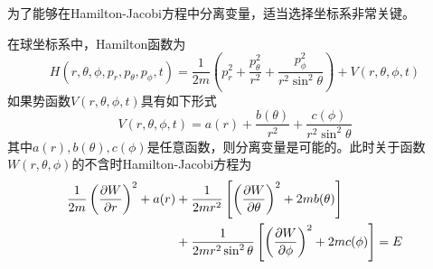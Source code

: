 为了能够在Hamilton-Jacobi方程中分离变量，适当选择坐标系非常关键。

\begin{example}
在球坐标系中，Hamilton函数为
\begin{equation}
	H(r,\theta,\phi,p_r,p_\theta,p_\phi,t) = \frac{1}{2m}\left(p_r^2+\frac{p_\theta^2}{r^2}+\frac{p_\phi^2}{r^2\sin^2\theta}\right)+V(r,\theta,\phi,t)
	\label{球坐标系中Hamilton-Jacobi方程的分离变量-1.1}
\end{equation}
如果势函数$V(r,\theta,\phi,t)$具有如下形式
\begin{equation}
	V(r,\theta,\phi,t) = a(r)+\frac{b(\theta)}{r^2}+\frac{c(\phi)}{r^2\sin^2\theta}
	\label{球坐标系中Hamilton-Jacobi方程的分离变量-1.2}
\end{equation}
其中$a(r),b(\theta),c(\phi)$是任意函数，则分离变量是可能的。此时关于函数$W(r,\theta,\phi)$的不含时Hamilton-Jacobi方程为
\begin{align}
	\frac{1}{2m}\left(\frac{\partial W}{\partial r}\right)^2+a(r)& {}+\frac{1}{2mr^2}\left[\left(\frac{\partial W}{\partial \theta}\right)^2+2mb(\theta)\right] \nonumber \\
	& {}+ \frac{1}{2mr^2\sin^2\theta}\left[\left(\frac{\partial W}{\partial \phi}\right)^2+2mc(\phi)\right] = E
	\label{球坐标系中Hamilton-Jacobi方程的分离变量-2}
\end{align}


\end{example}
